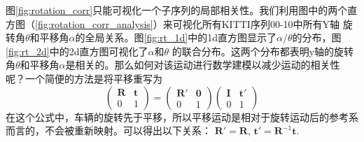 图\ref{fig:rotation_corr}只能可视化一个子序列的局部相关性。我们利用图中的两个直方图（\ref{fig:rotation_corr_analysis}）来可视化所有KITTI序列00-10中所有Y轴
旋转角$\theta$和平移角$\alpha$的全局关系。图\ref{fig:rt_1d}中的1d直方图显示了$\alpha/\theta$的分布，图\ref{fig:rt_2d}中的2d直方图可视化了$\alpha$和$\theta$
的联合分布。这两个分布都表明y轴的旋转角$\theta$和平移角$\alpha$是相关的。那么如何对该运动进行数学建模以减少运动的相关性呢？一个简便的方法是将平移重写为
\begin{equation}
    \begin{pmatrix} \mathbf{R} & \mathbf{t}\\ 0 & 1  \end{pmatrix} = \begin{pmatrix} \mathbf{R'}& \mathbf{0}\\ 0 & 1  \end{pmatrix}\begin{pmatrix} \mathbf{I}& \mathbf{t'}\\ 0 & 1  \end{pmatrix}
    \label{eq:frlt}
\end{equation}
在这个公式中，车辆的旋转先于平移，所以平移运动是相对于旋转运动后的参考系而言的，不会被重新映射。可以得出以下关系：
$\mathbf{R'} = \mathbf{R}$, $\mathbf{t'} = \mathbf{R}^{-1}\mathbf{t}$.
